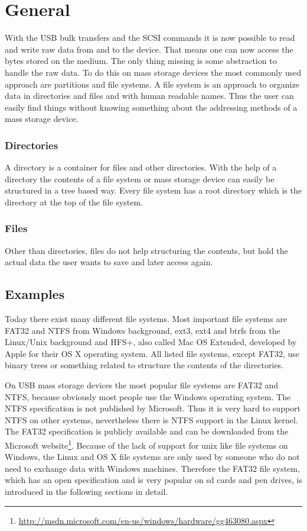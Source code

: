 \section{General}

With the USB bulk transfers and the SCSI commands it is now possible to read and write raw data from and to the device. That means one can now access the bytes stored on the medium. The only thing missing is some abstraction to handle the raw data. To do this on mass storage devices the most commonly used approach are partitions and file systems. A file system is an approach to organize data in directories and files and with human readable names. Thus the user can easily find things without knowing something about the addressing methods of a mass storage device.

\subsubsection{Directories}

A directory is a container for files and other directories. With the help of a directory the contents of a file system or mass storage device can easily be structured in a tree based way. Every file system has a root directory which is the directory at the top of the file system.

\subsubsection{Files}

Other than directories, files do not help structuring the contents, but hold the actual data the user wants to save and later access again.

\subsection{Examples}

Today there exist many different file systems. Most important file systems are FAT32 and NTFS from Windows background, ext3, ext4 and btrfs from the Linux/Unix background and HFS+, also called Mac OS Extended, developed by Apple for their OS X operating system. All listed file systems, except FAT32, use binary trees or something related to structure the contents of the directories.

On USB mass storage devices the most popular file systems are FAT32 and NTFS, because obviously most people use the Windows operating system. The NTFS specification is not published by Microsoft. Thus it is very hard to support NTFS on other systems, nevertheless there is NTFS support in the Linux kernel. The FAT32 specification is publicly available and can be downloaded from the Microsoft website\footnote{\url{http://msdn.microsoft.com/en-us/windows/hardware/gg463080.aspx}}. Because of the lack of support for unix like file systems on Windows, the Linux and OS X file systems are only used by someone who do not need to exchange data with Windows machines. Therefore the FAT32 file system, which has an open specification and is very popular on sd cards and pen drives, is introduced in the following sections in detail.

